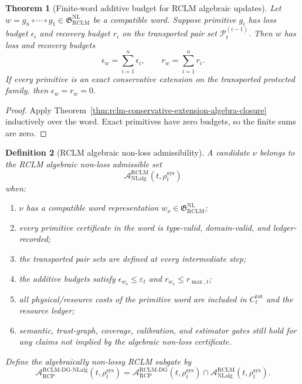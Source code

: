 \documentclass[11pt,a4paper]{article}
\newtheorem{theorem}{Theorem}[section]
\newtheorem{definition}[theorem]{Definition}
\newcommand{\Pcal}{\mathcal P}
\newcommand{\Acal}{\mathcal A}
\newcommand{\eps}{\varepsilon}
\newcommand{\RCP}{\mathrm{RCP}}
\newcommand{\RCLM}{\mathrm{RCLM}}
\newcommand{\DG}{\mathrm{DG}}
\newcommand{\sys}{\mathrm{sys}}
\newcommand{\tot}{\mathrm{tot}}
\newcommand{\NL}{\mathrm{NL}}
\newcommand{\NLalg}{\mathrm{NLalg}}
\begin{document}
\begin{theorem}[Finite-word additive budget for RCLM algebraic updates]
\label{thm:rclm-finite-word-additive-budget}
Let \(w=g_n\circ\cdots\circ g_1\in\mathfrak G_{\RCLM}^{\NL}\) be a compatible word.  Suppose primitive \(g_i\) has loss budget \(\epsilon_i\) and recovery budget \(r_i\) on the transported pair set \(\Pcal_t^{(i-1)}\).  Then \(w\) has loss and recovery budgets
\[
\epsilon_w=\sum_{i=1}^{n}\epsilon_i,
\qquad
r_w=\sum_{i=1}^{n}r_i.
\]
If every primitive is an exact conservative extension on the transported protected family, then \(\epsilon_w=r_w=0\).
\end{theorem}

\begin{proof}
Apply Theorem~\ref{thm:rclm-conservative-extension-algebra-closure} inductively over the word.  Exact primitives have zero budgets, so the finite sums are zero.
\end{proof}

\begin{definition}[RCLM algebraic non-loss admissibility]
\label{def:rclm-algebraic-nonloss-admissibility}
A candidate \(\nu\) belongs to the RCLM algebraic non-loss admissible set
\[
\Acal_{\NLalg}^{\RCLM}(t,\rho_t^{\sys})
\]
when:
\begin{enumerate}[label=(\roman*),leftmargin=1.5em]
    \item \(\nu\) has a compatible word representation \(w_\nu\in\mathfrak G_{\RCLM}^{\NL}\);
    \item every primitive certificate in the word is type-valid, domain-valid, and ledger-recorded;
    \item the transported pair sets are defined at every intermediate step;
    \item the additive budgets satisfy \(\epsilon_{w_\nu}\le\eps_t\) and \(r_{w_\nu}\le r_{\max,t}\);
    \item all physical/resource costs of the primitive word are included in \(C_t^{\tot}\) and the resource ledger;
    \item semantic, trust-graph, coverage, calibration, and estimator gates still hold for any claims not implied by the algebraic non-loss certificate.
\end{enumerate}
Define the algebraically non-lossy RCLM subgate by
\[
\Acal_{\RCP}^{\RCLM\text{-}\DG\text{-}\NLalg}(t,\rho_t^{\sys})
=
\Acal_{\RCP}^{\RCLM\text{-}\DG}(t,\rho_t^{\sys})
\cap
\Acal_{\NLalg}^{\RCLM}(t,\rho_t^{\sys}).
\]
\end{definition}
\end{document}
